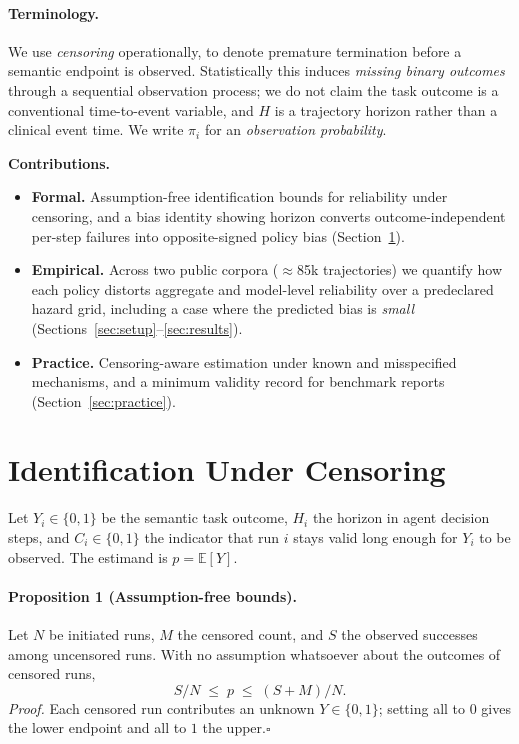 \documentclass[letterpaper]{article}
\begin{document}
\paragraph{Terminology.} We use \emph{censoring} operationally, to denote
premature termination before a semantic endpoint is observed. Statistically this
induces \emph{missing binary outcomes} through a sequential observation process;
we do not claim the task outcome is a conventional time-to-event variable, and
$H$ is a trajectory horizon rather than a clinical event time. We write
$\pi_i$ for an \emph{observation probability}.

\vspace{2pt}
\noindent\textbf{Contributions.}
\begin{itemize}\itemsep1pt \parskip0pt 
\item \textbf{Formal.} Assumption-free identification bounds for reliability
under censoring, and a bias identity showing horizon converts
outcome-independent per-step failures into opposite-signed policy bias
(Section~\ref{sec:model}).
\item \textbf{Empirical.} Across two public corpora ($\approx$85k trajectories)
we quantify how each policy distorts aggregate and model-level reliability over
a predeclared hazard grid, including a case where the predicted bias is
\emph{small} (Sections~\ref{sec:setup}--\ref{sec:results}).
\item \textbf{Practice.} Censoring-aware estimation under known and
misspecified mechanisms, and a minimum validity record for benchmark reports
(Section~\ref{sec:practice}).
\end{itemize}

\section{Identification Under Censoring}
\label{sec:model}

Let $Y_i\in\{0,1\}$ be the semantic task outcome, $H_i$ the horizon in agent
decision steps, and $C_i\in\{0,1\}$ the indicator that run $i$ stays valid long
enough for $Y_i$ to be observed. The estimand is $p=\mathbb{E}[Y]$.

\paragraph{Proposition 1 (Assumption-free bounds).}
Let $N$ be initiated runs, $M$ the censored count, and $S$ the observed
successes among uncensored runs. With no assumption whatsoever about the
outcomes of censored runs,
\begin{equation}
S/N \;\le\; p \;\le\; (S+M)/N .
\label{eq:bounds}
\end{equation}
\emph{Proof.} Each censored run contributes an unknown $Y\in\{0,1\}$; setting
all to $0$ gives the lower endpoint and all to $1$ the upper.\hfill$\square$
\end{document}
